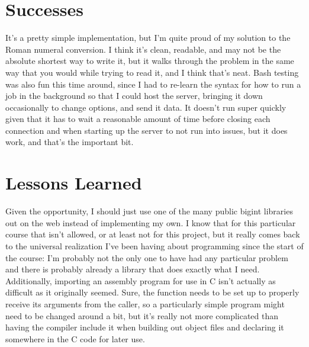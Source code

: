 \documentclass[11pt]{report}
\begin{document}
\section*{Successes}
It's a pretty simple implementation, but I'm quite proud of my solution to the Roman numeral conversion. I think it's clean, readable, and may not be the absolute shortest way to write it, but it walks through the problem in the same way that you would while trying to read it, and I think that's neat. Bash testing was also fun this time around, since I had to re-learn the syntax for how to run a job in the background so that I could host the server, bringing it down occasionally to change options, and send it data. It doesn't run super quickly given that it has to wait a reasonable amount of time before closing each connection and when starting up the server to not run into issues, but it does work, and that's the important bit.
\section*{Lessons Learned}
Given the opportunity, I should just use one of the many public bigint libraries out on the web instead of implementing my own. I know that for this particular course that isn't allowed, or at least not for this project, but it really comes back to the universal realization I've been having about programming since the start of the course: I'm probably not the only one to have had any particular problem and there is probably already a library that does exactly what I need. Additionally, importing an assembly program for use in C isn't actually as difficult as it originally seemed. Sure, the function needs to be set up to properly receive its arguments from the caller, so a particularly simple program might need to be changed around a bit, but it's really not more complicated than having the compiler include it when building out object files and declaring it somewhere in the C code for later use.
\end{document}
